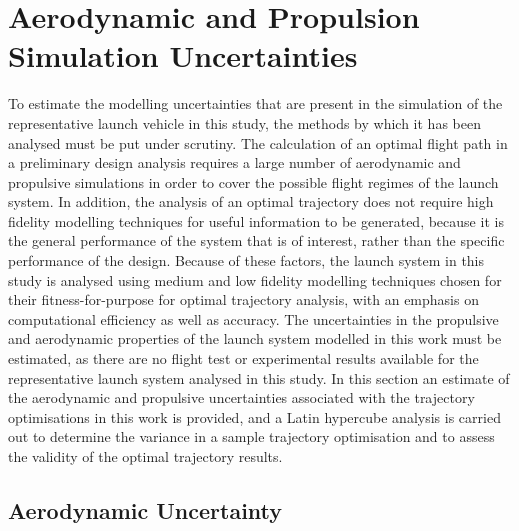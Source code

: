  







\section{Aerodynamic and Propulsion Simulation Uncertainties}\label{sec:aerounc}

To estimate the modelling uncertainties that are present in the simulation of the representative launch vehicle in this study, the methods by which it has been analysed must be put under scrutiny. 
The calculation of an optimal flight path in a preliminary design analysis requires a large number of aerodynamic and propulsive simulations in order to cover the possible flight regimes of the launch system. In addition, the analysis of an optimal trajectory does not require high fidelity modelling techniques for useful information to be generated, because it is the general performance of the system that is of interest, rather than the specific performance of the design. Because of these factors, the launch system in this study is analysed using medium and low fidelity modelling techniques chosen for their fitness-for-purpose for optimal trajectory analysis, with an emphasis on computational efficiency as well as accuracy.
The uncertainties in the propulsive and aerodynamic properties of the launch system modelled in this work must be estimated, as there are no flight test or experimental results available for the representative launch system analysed in this study. In this section an estimate of the aerodynamic and propulsive uncertainties associated with the trajectory optimisations in this work is provided, and a Latin hypercube analysis is carried out to determine the variance in a sample trajectory optimisation and to assess the validity of the optimal trajectory results. 

\subsection{Aerodynamic Uncertainty}



